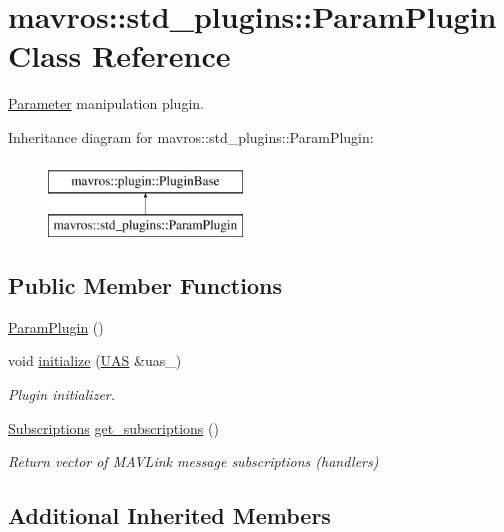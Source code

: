 \hypertarget{classmavros_1_1std__plugins_1_1ParamPlugin}{}\section{mavros\+::std\+\_\+plugins\+::Param\+Plugin Class Reference}
\label{classmavros_1_1std__plugins_1_1ParamPlugin}


\mbox{\hyperlink{classmavros_1_1std__plugins_1_1Parameter}{Parameter}} manipulation plugin.  


Inheritance diagram for mavros\+::std\+\_\+plugins\+::Param\+Plugin\+:\begin{figure}[H]
\begin{center}
\leavevmode
\includegraphics[height=2.000000cm]{classmavros_1_1std__plugins_1_1ParamPlugin}
\end{center}
\end{figure}
\subsection*{Public Member Functions}
\begin{DoxyCompactItemize}
\item 
\mbox{\hyperlink{group__plugin_ga7c2bfbe1cd5b72b7685ad0b875e935db}{Param\+Plugin}} ()
\item 
void \mbox{\hyperlink{group__plugin_gad1185b49c13a316fd54ef08895ac012e}{initialize}} (\mbox{\hyperlink{classmavros_1_1UAS}{U\+AS}} \&uas\+\_\+)
\begin{DoxyCompactList}\small\item\em Plugin initializer. \end{DoxyCompactList}\item 
\mbox{\hyperlink{group__plugin_ga8967d61fc77040e0c3ea5a4585d62a09}{Subscriptions}} \mbox{\hyperlink{group__plugin_gac1471c7f06987a6ca0b199634a80f22b}{get\+\_\+subscriptions}} ()
\begin{DoxyCompactList}\small\item\em Return vector of M\+A\+V\+Link message subscriptions (handlers) \end{DoxyCompactList}\end{DoxyCompactItemize}
\subsection*{Additional Inherited Members}


